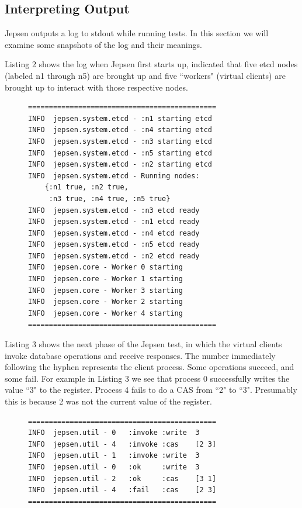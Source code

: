 \documentclass[12pt,conference]{IEEEtran}
\begin{document}
\subsection{Interpreting Output}

Jepsen outputs a log to stdout while running tests. In this section we will examine some snapshots of the log and their meanings.

Listing 2 shows the log when Jepsen first starts up, indicated that five etcd nodes (labeled n1 through n5) are brought up and five ``workers" (virtual clients) are brought up to interact with those respective nodes.

\begin{figure}[!t]
    \scriptsize
\begin{lstlisting}[caption={Jepsen start sequence},label={jepsenStartSequence}]
=============================================
INFO  jepsen.system.etcd - :n1 starting etcd
INFO  jepsen.system.etcd - :n4 starting etcd
INFO  jepsen.system.etcd - :n3 starting etcd
INFO  jepsen.system.etcd - :n5 starting etcd
INFO  jepsen.system.etcd - :n2 starting etcd
INFO  jepsen.system.etcd - Running nodes: 
	{:n1 true, :n2 true,
	 :n3 true, :n4 true, :n5 true}
INFO  jepsen.system.etcd - :n3 etcd ready
INFO  jepsen.system.etcd - :n1 etcd ready
INFO  jepsen.system.etcd - :n4 etcd ready
INFO  jepsen.system.etcd - :n5 etcd ready
INFO  jepsen.system.etcd - :n2 etcd ready
INFO  jepsen.core - Worker 0 starting
INFO  jepsen.core - Worker 1 starting
INFO  jepsen.core - Worker 3 starting
INFO  jepsen.core - Worker 2 starting
INFO  jepsen.core - Worker 4 starting
=============================================
\end{lstlisting}
\end{figure}

Listing 3 shows the next phase of the Jepsen test, in which the virtual clients invoke database operations and receive responses. The number immediately following the hyphen represents the client process. Some operations succeed, and some fail. For example in Listing 3 we see that process 0 successfully writes the value ``3" to the register. Process 4 fails to do a CAS from ``2" to ``3". Presumably this is because 2 was not the current value of the register.

\begin{figure}[!t]
    \scriptsize
\begin{lstlisting}[caption={Jepsen Database Operations},label={jepsenTestingPhase}]
=============================================
INFO  jepsen.util - 0   :invoke :write  3
INFO  jepsen.util - 4   :invoke :cas    [2 3]
INFO  jepsen.util - 1   :invoke :write  3
INFO  jepsen.util - 0   :ok     :write  3
INFO  jepsen.util - 2   :ok     :cas    [3 1]
INFO  jepsen.util - 4   :fail   :cas    [2 3]
=============================================
\end{lstlisting}
\end{figure}
\end{document}
